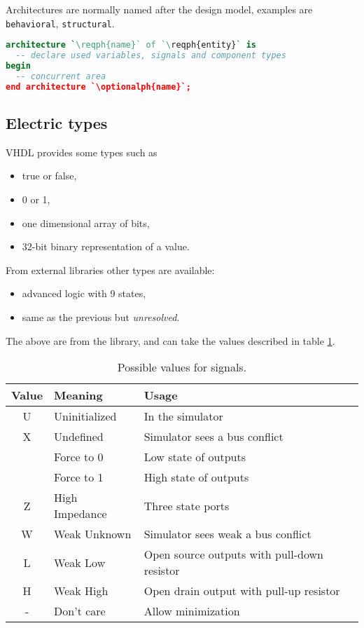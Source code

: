 Architectures are normally named after the design model, examples are
\texttt{behavioral}, \texttt{structural}.
\begin{lstlisting}[language=vhdl]
architecture `\reqph{name}` of `\reqph{entity}` is
  -- declare used variables, signals and component types
begin
  -- concurrent area
end architecture `\optionalph{name}`;
\end{lstlisting}

\subsection{Electric types}
VHDL provides some types such as
\begin{itemize}
  \item {} true or false,
  \item {} 0 or 1,
  \item {} one dimensional array of bits,
  \item {} 32-bit binary representation of a value.
\end{itemize}
From external libraries other types are available:
\begin{itemize}
  \item {} advanced logic with 9 states,
  \item {} same as the previous but \emph{unresolved}.
\end{itemize}
The above are from the  library, and can take the
values described in table \ref{tab:std-logic-1164-types}.
\begin{table}[h]
  \centering
  \begin{tabularx}{\linewidth}{>{\ttfamily}c l X}
    \toprule
    Value & Meaning & Usage \\
    \midrule
    U & Uninitialized  & In the simulator \\
    X & Undefined      & Simulator sees a bus conflict \\
    0 & Force to 0     & Low state of outputs \\
    1 & Force to 1     & High state of outputs \\
    Z & High Impedance & Three state ports \\
    W & Weak Unknown   & Simulator sees weak a bus conflict \\
    L & Weak Low       & Open source outputs with pull-down resistor \\
    H & Weak High      & Open drain output with pull-up resistor \\
    - & Don't care     & Allow minimization \\
    \bottomrule
  \end{tabularx}
  \caption{
    Possible values for  signals.
    \label{tab:std-logic-1164-types}
  }
\end{table}
